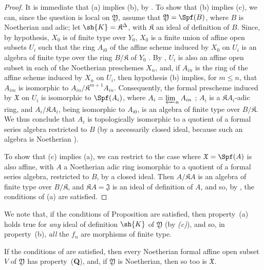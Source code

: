 \begin{proof}
It is immediate that (a) implies (b), by .
To show that (b) implies (c), we can, since the question is local on $\mathfrak{Y}$, assume that $\mathfrak{Y}=\Spf(B)$, where $B$ is Noetherian and adic;
let $\sh{K}=\mathfrak{K}^\Delta$, with $\mathfrak{K}$ an ideal of definition of $B$.
Since, by hypothesis, $X_0$ is of finite type over $Y_0$, $X_0$ is a finite union of affine open subsets $U_i$ such that the ring $A_{i0}$ of the affine scheme induced by $X_0$ on $U_i$ is an algebra of finite type over the ring $B/\mathfrak{K}$ of $Y_0$ .
By , $U_i$ is also an affine open subset in each of the Noetherian preschemes $X_n$, and, if $A_{in}$ is the ring of the affine scheme induced by $X_n$ on $U_i$, then hypothesis (b) implies, for $m\leq n$, that $A_{im}$ is isomorphic to $A_{in}/\mathfrak{K}^{m+1}A_{in}$.
Consequently, the formal prescheme induced by $\mathfrak{X}$ on $U_i$ is isomorphic to $\Spf(A_i)$, where $A_i=\varprojlim_n A_{in}$ ;
$A_i$ is a $\mathfrak{K}A_i$-adic ring, and $A_i/\mathfrak{K}A_i$, being isomorphic to $A_{i0}$, is an algebra of finite type over $B/\mathfrak{K}$.
We thus conclude  that $A_i$ is topologically isomorphic to a quotient of a formal series algebra restricted to $B$ (by a necessarily closed ideal, because such an algebra is Noetherian ).

To show that (c) implies (a), we can restrict to the case where $\mathfrak{X}=\Spf(A)$ is also affine, with $A$ a Noetherian adic ring isomorphic to a quotient of a formal series algebra, restricted to $B$, by a closed ideal.
Then  $A/\mathfrak{K}A$ is an algebra of finite type over $B/\mathfrak{K}$, and $\mathfrak{K}A=\mathfrak{J}$ is an ideal of definition of $A$, and so, by , the conditions of (a) are satisfied.
\end{proof}

We note that, if the conditions of Proposition  are satisfied, then property~(a) holds true for \emph{any} ideal of definition $\sh{K}$ of $\mathfrak{Y}$ (by \emph{(c)}), and so, in property~(b), \emph{all} the $f_n$ are morphisms of finite type.

\begin{corollary}[10.13.2]
\label{I.10.13.2}
If the conditions of  are satisfied, then every Noetherian formal affine open subset $V$ of $\mathfrak{Y}$ has property~(\textbf{Q}), and, if $\mathfrak{Y}$ is Noetherian, then so too is $\mathfrak{X}$.
\end{corollary}

